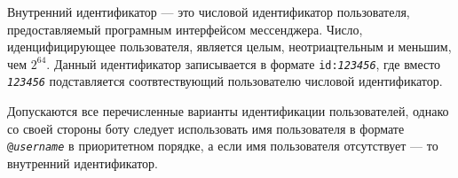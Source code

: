     Внутренний идентификатор --- это числовой идентификатор пользователя, предоставляемый
    програмным интерфейсом мессенджера. Число, иденцифицирующее пользователя, является целым,
    неотриацтельным и меньшим, чем \(2^{64}\). Данный идентификатор записывается в формате
    \texttt{id:\textit{123456}}, где вместо \texttt{\textit{123456}} подставляется соотвтествующий
    пользователю числовой идентификатор.

    Допускаются все перечисленные варианты идентификации пользователей, однако со своей стороны боту
    следует использовать имя пользователя в формате \texttt{@\textit{username}} в приоритетном порядке,
    а если имя пользователя отсутствует --- то внутренний идентификатор.
